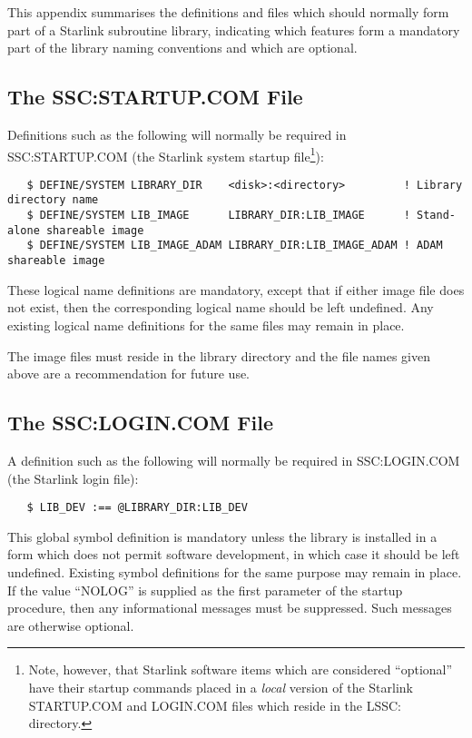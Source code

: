 This appendix summarises the definitions and files which should normally
form part of a Starlink subroutine library, indicating which features form a
mandatory part of the library naming conventions and which are optional.

\subsection{The SSC:STARTUP.COM File}

Definitions such as the following will normally be required in
SSC:STARTUP.COM (the Starlink system startup
file\footnote{Note, however, that Starlink software items which are
considered ``optional'' have their startup commands placed in a {\em
local\/} version of the Starlink STARTUP.COM and LOGIN.COM files which
reside in the LSSC: directory.}):

\begin{verbatim}
   $ DEFINE/SYSTEM LIBRARY_DIR    <disk>:<directory>         ! Library directory name
   $ DEFINE/SYSTEM LIB_IMAGE      LIBRARY_DIR:LIB_IMAGE      ! Stand-alone shareable image
   $ DEFINE/SYSTEM LIB_IMAGE_ADAM LIBRARY_DIR:LIB_IMAGE_ADAM ! ADAM shareable image
\end{verbatim}

These logical name definitions are mandatory, except that if either image
file does not exist, then the corresponding logical name should be left
undefined.
Any existing logical name definitions for the same files may remain in place.

The image files must reside in the library directory and the file names
given above are a recommendation for future use.

\subsection{The SSC:LOGIN.COM File}

A definition such as the following will normally be required in
SSC:LOGIN.COM (the Starlink login file\footnotemark[\thefootnote]):

\begin{verbatim}
   $ LIB_DEV :== @LIBRARY_DIR:LIB_DEV
\end{verbatim}

This global symbol definition is mandatory unless the library is installed
in a form which does not permit software development, in which case it
should be left undefined.
Existing symbol definitions for the same purpose may remain in place.
If the value ``NOLOG'' is supplied as the first parameter of the startup
procedure, then any informational messages must be suppressed.
Such messages are otherwise optional.

